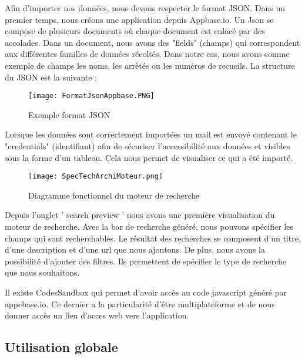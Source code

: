Afin d'importer nos données, nous devons respecter le format JSON.
Dans un premier temps, nous créons une application depuis Appbase.io. 
Un Json se compose de plusieurs documents où chaque document est enlacé par des accolades. Dans un document, nous avons des "fields" (champs) qui correspondent aux différentes familles de données récoltés. Dans notre cas, nous avons comme exemple de champs les noms, les arrêtés ou les numéros de recueils. La structure du JSON est la suivante :


\begin{figure}[h!]
  \centering
	\texttt{[image: FormatJsonAppbase.PNG]}
	\caption[]{Exemple format JSON}
  \label{}
\end{figure}

Lorsque les données sont correctement importées un mail est envoyé contenant le "credentials" (identifiant) afin de sécuriser l'accessibilité aux données et visibles sous la forme d'un tableau. Cela nous permet de visualiser ce qui a été importé. 

\begin{figure}[h!]
  \centering
	\texttt{[image: SpecTechArchiMoteur.png]}
	\caption[]{Diagramme fonctionnel du moteur de recherche}
  \label{}
\end{figure}

Depuis l’onglet ' search preview ' nous avons une première visualisation du moteur de recherche. Avec la bar de recherche généré, nous pouvons spécifier les champs qui sont recherchables. 
Le résultat des recherches se composent d’un titre, d’une description et d’une url que nous ajoutons. De plus, nous avons la possibilité d’ajouter des filtres. Ils permettent de spécifier le type de recherche que nous souhaitons.

Il existe CodesSandbox qui permet d’avoir accès au code javascript généré par appebase.io. Ce dernier a la particularité d’être multiplateforme et de nous donner accès un lien d’acces web vers l’application.


\subsection {Utilisation globale}

